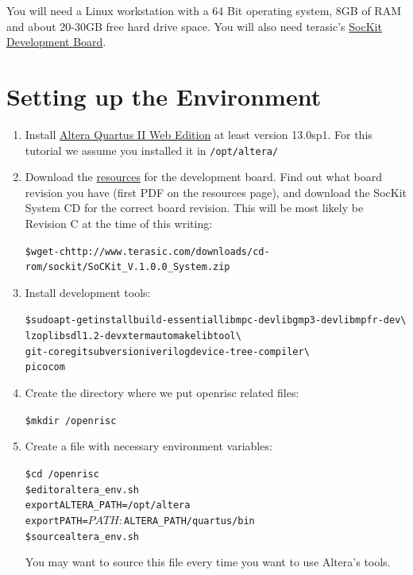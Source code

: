 \documentclass[twoside]{article}
\begin{document}
You will need a Linux workstation with a 64 Bit operating system, 8GB
of RAM and about 20-30GB free hard drive space. You will also need
terasic's
\href{http://www.terasic.com.tw/cgi-bin/page/archive.pl?Language=English\&No=816}{SocKit
  Development Board}.


\section{Setting up the Environment}
\begin{enumerate}
\item Install \href{http://dl.altera.com/?edition=web}{Altera Quartus
    II Web Edition} at least version 13.0sp1. For this tutorial we assume
  you installed it in \texttt{/opt/altera/}

\item Download the
  \href{http://www.terasic.com.tw/cgi-bin/page/archive.pl?Language=English\&CategoryNo=165\&No=816\&PartNo=4}{resources}
  for the development board. Find out what board revision you have
  (first PDF on the resources page), and download the SocKit System CD
  for the correct board revision. This will be most likely be Revision
  C at the time of this writing:
  \begin{alltt}
\$ wget -c http://www.terasic.com/downloads/cd-rom/sockit/SoCKit\_V.1.0.0\_System.zip
  \end{alltt}

\item Install development tools:
  \begin{alltt}
\$ sudo apt-get install build-essential libmpc-dev libgmp3-dev libmpfr-dev  \textbackslash
                       lzop libsdl1.2-dev xterm automake libtool \textbackslash
                       git-core git subversion iverilog device-tree-compiler \textbackslash
                       picocom
  \end{alltt}

\item Create the directory where we put openrisc related files:
  \begin{alltt}
\$ mkdir ~/openrisc
  \end{alltt}

\item Create a file with necessary environment variables:
  \begin{alltt}
\$ cd ~/openrisc
\$ editor altera_env.sh
\hrulefill
export ALTERA_PATH=/opt/altera
export PATH=$PATH:$ALTERA_PATH/quartus/bin
\hrulefill
\$ source altera_env.sh
  \end{alltt}
  You may want to source this file every time you want to use Altera's
  tools.


\end{enumerate}
\end{document}
